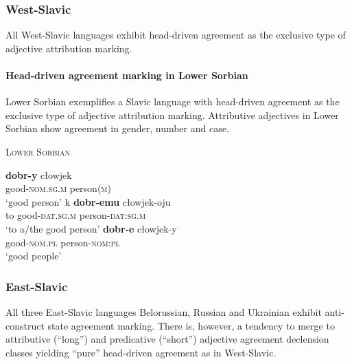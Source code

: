 \subsubsection{West-Sla\-vic}
All West-Sla\-vic languages exhibit head-driven agreement as the exclusive type of adjective attribution marking.
\paragraph{Head-driven agreement marking in Lower Sorbian}
Lower Sorbian exemplifies a Sla\-vic language with head-driven agreement as the exclusive type of adjective attribution marking. Attributive adjectives in Lower Sorbian show agreement in gender, number and case. 

\begin{exe}
\ex \textsc{Lower Sorbian} \citep{janas1976}
\begin{xlist}
\ex
\gll	\textbf{dobr-y} cłowjek\\
	good-\textsc{nom.sg.m} person(\textsc{m})\\
\glt	‘good person’
\ex
\gll	k \textbf{dobr-emu} cłowjek-oju\\
	to good-\textsc{dat.sg.m} person-\textsc{dat:sg.m}\\
\glt	‘to a/the good person’
\ex
\gll	\textbf{dobr-e} cłowjek-y\\
	good-\textsc{nom.pl} person-\textsc{nom:pl}\\
\glt	‘good people’
\end{xlist}
\end{exe}

\subsubsection{East-Sla\-vic}
All three East-Sla\-vic languages Belorussian, Russian and Ukrainian exhibit anti-construct state agreement marking. There is, however, a tendency to merge to attributive (“long”) and predicative (“short”) adjective agreement declension classes yielding “pure” head-driven agreement as in West-Sla\-vic.

